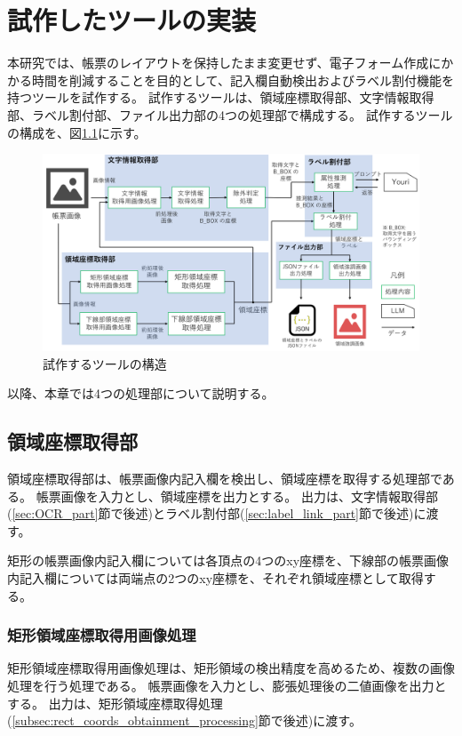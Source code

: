 \chapter{試作したツールの実装}\label{cha:Implementation}
本研究では、帳票のレイアウトを保持したまま変更せず、電子フォーム作成にかかる時間を削減することを目的として、記入欄自動検出およびラベル割付機能を持つツールを試作する。
試作するツールは、領域座標取得部、文字情報取得部、ラベル割付部、ファイル出力部の4つの処理部で構成する。
試作するツールの構成を、図\ref{fig:structure}に示す。

\begin{figure}[tp]
    \begin{center}
        \includegraphics[width=15cm]{image/04-implementation/structure.png}
        \caption{試作するツールの構造}
        \label{fig:structure}
    \end{center}
\end{figure}

以降、本章では4つの処理部について説明する。


\section{領域座標取得部}\label{sec:area_coords_obtainment_part}
領域座標取得部は、帳票画像内記入欄を検出し、領域座標を取得する処理部である。
帳票画像を入力とし、領域座標を出力とする。
出力は、文字情報取得部(\ref{sec:OCR_part}節で後述)とラベル割付部(\ref{sec:label_link_part}節で後述)に渡す。

矩形の帳票画像内記入欄については各頂点の4つのxy座標を、下線部の帳票画像内記入欄については両端点の2つのxy座標を、それぞれ領域座標として取得する。

\subsection{矩形領域座標取得用画像処理}\label{subsec:image_processing_for_rect_coords_obtainment}
矩形領域座標取得用画像処理は、矩形領域の検出精度を高めるため、複数の画像処理を行う処理である。
帳票画像を入力とし、膨張処理後の二値画像を出力とする。
出力は、矩形領域座標取得処理(\ref{subsec:rect_coords_obtainment_processing}節で後述)に渡す。


